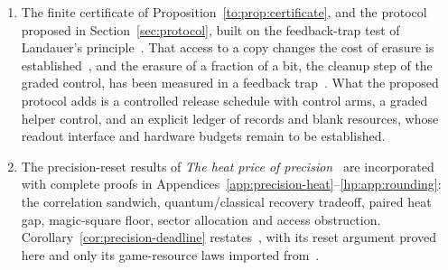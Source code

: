 \begin{enumerate}[label=(\arabic*),leftmargin=*,itemsep=1pt,topsep=2pt]
\item The finite certificate of Proposition~\ref{to:prop:certificate}, and the protocol proposed in Section~\ref{sec:protocol}, built on the feedback-trap test of Landauer's principle~\cite{Jun14}. That access to a copy changes the cost of erasure is established~\cite{Bennett03,delRio11,Orlov12}, and the erasure of a fraction of a bit, the cleanup step of the graded control, has been measured in a feedback trap~\cite{Gavrilov17}. What the proposed protocol adds is a controlled release schedule with control arms, a graded helper control, and an explicit ledger of records and blank resources, whose readout interface and hardware budgets remain to be established.
\item The precision-reset results of \emph{The heat price of precision}~\cite{HPheat} are incorporated with complete proofs in Appendices~\ref{app:precision-heat}--\ref{hp:app:rounding}: the correlation sandwich, quantum/classical recovery tradeoff, paired heat gap, magic-square floor, sector allocation and access obstruction. Corollary~\ref{cor:precision-deadline} restates~\cite[Corollary~13.1]{HPuncomputable}, with its reset argument proved here and only its game-resource laws imported from~\cite[Theorem~1.1]{HPuncomputable}.
\end{enumerate}

